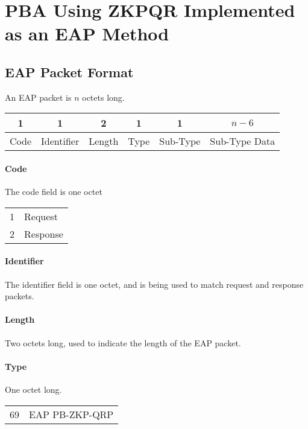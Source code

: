\section{PBA Using ZKPQR Implemented as an EAP Method} %

\subsection{EAP Packet Format}
An EAP packet is $n$ octets long.


\begin{center}
\begin{tabular}{|c|c|c|c|c|c|}
	\hline
	1 & 1 & 2 & 1 & 1 & $n - 6$\\
	\hline
	Code & Identifier & Length & Type & Sub-Type & Sub-Type Data\\
	\hline 
\end{tabular}
\end{center}

\paragraph{Code}
The code field is one octet

\bigskip

\begin{tabular}{ll}
	1 & Request \\
	2 & Response\\
\end{tabular}

\paragraph{Identifier} The identifier field is one octet, and is being used to match request and response packets.

\paragraph{Length} Two octets long, used to indicate the length of the EAP packet.

\paragraph{Type} One octet long.

\bigskip

\begin{tabular}{ll} %
	69 & EAP PB-ZKP-QRP \\
\end{tabular}

